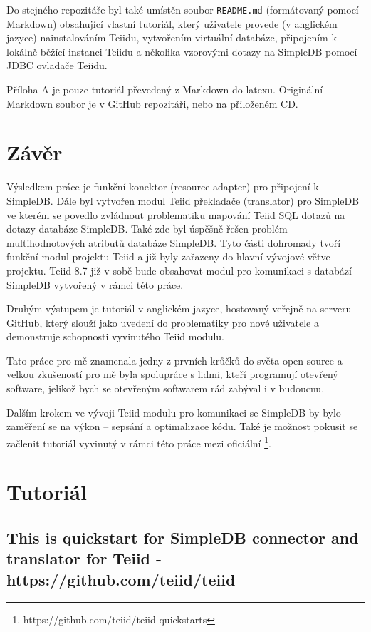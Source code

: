 \documentclass[oneside,12pt]{fithesis2}
\begin{document}
Do stejného repozitáře byl také umístěn soubor \texttt{README.md} (formátovaný pomocí Markdown) obsahující vlastní tutoriál, který uživatele provede (v anglickém jazyce) nainstalováním Teiidu, vytvořením virtuální databáze, připojením k lokálně běžící instanci Teiidu a několika vzorovými dotazy na SimpleDB pomocí JDBC ovladače Teiidu.

Příloha A je pouze tutoriál převedený z Markdown do latexu. Originální Markdown soubor je v GitHub repozitáři, nebo na přiloženém CD.
\chapter{Závěr}
Výsledkem práce je funkční konektor (resource adapter) pro připojení k SimpleDB. Dále byl vytvořen modul Teiid překladače (translator) pro SimpleDB ve kterém se povedlo zvládnout problematiku mapování Teiid SQL dotazů na dotazy databáze SimpleDB. Také zde byl úspěšně řešen problém multihodnotových atributů databáze SimpleDB. Tyto části dohromady tvoří funkční modul projektu Teiid a již byly zařazeny do hlavní vývojové větve projektu. Teiid 8.7 již v sobě bude obsahovat modul pro komunikaci s databází SimpleDB vytvořený v rámci této práce.

Druhým výstupem je tutoriál v anglickém jazyce, hostovaný veřejně na serveru GitHub, který slouží jako uvedení do problematiky pro nové uživatele a demonstruje schopnosti vyvinutého Teiid modulu.

Tato práce pro mě znamenala jedny z prvních krůčků do světa open-source a velkou zkušeností pro mě byla spolupráce s lidmi, kteří programují otevřený software, jelikož bych se otevřeným softwarem rád zabýval i v budoucnu.

Dalším krokem ve vývoji Teiid modulu pro komunikaci se SimpleDB by bylo zaměření se na výkon -- sepsání  a optimalizace kódu. Také je možnost pokusit se začlenit tutoriál vyvinutý v rámci této práce mezi oficiální \footnote{https://github.com/teiid/teiid-quickstarts}.
\nocite{*}

\appendix
\chapter{Tutoriál}
\label{tutorial}
\section*{This is quickstart for SimpleDB connector and translator for Teiid - https://github.com/teiid/teiid}
\end{document}
